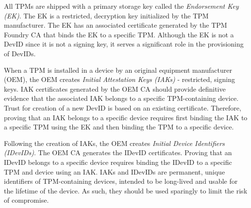 \documentclass[runningheads]{llncs}
\begin{document}

All TPMs are shipped with a primary storage key called the \emph{Endorsement
Key (EK)}.  The EK is a restricted, decryption key initialized
by the TPM manufacturer.  The EK has an associated certificate generated 
by the TPM Foundry CA that binds the EK to a specific TPM. Although 
the EK is not a DevID since it is not a signing key,
it serves a significant role in the provisioning of DevIDs.



When a TPM is installed in a device by an original equipment manufacturer (OEM), 
the OEM creates \emph{Initial Attestation Keys (IAKs)} - restricted, signing 
keys. IAK certificates generated by the OEM CA 
should provide definitive evidence that the associated IAK belongs to a specific 
TPM-containing device. 
Trust for creation of a new DevID is based on an existing certificate.
Therefore, proving that an IAK belongs to a specific device requires first
binding the IAK to a specific TPM using the EK and then binding the TPM to a 
specific device.


Following the creation of IAKs, the OEM creates
\emph{Initial Device Identifiers (IDevIDs)}. The OEM CA generates the IDevID certificates.
Proving that an IDevID belongs to a specific device requires binding the IDevID
to a specific TPM and device using an IAK.
IAKs and IDevIDs are permanent, unique identifiers of TPM-containing 
devices, intended to be long-lived and usable for the lifetime of the device. 
As such, they should be used sparingly to limit the risk of compromise.

\end{document}
